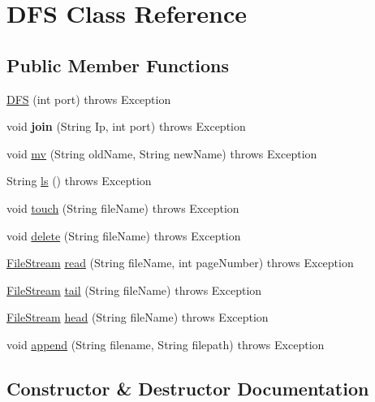 \hypertarget{class_d_f_s}{}\section{D\+FS Class Reference}
\label{class_d_f_s}
\subsection*{Public Member Functions}
\begin{DoxyCompactItemize}
\item 
\mbox{\hyperlink{class_d_f_s_ad863806217afcce82e64f5d7d4c124ad}{D\+FS}} (int port)  throws Exception     
\item 
\mbox{\label{class_d_f_s_afb27b3ac552ee5a0b615f76157ebde81}} 
void {\bfseries join} (String Ip, int port)  throws Exception 
\item 
void \mbox{\hyperlink{class_d_f_s_a7b0d44e11c6176a71d040919b6fe1d96}{mv}} (String old\+Name, String new\+Name)  throws Exception 
\item 
String \mbox{\hyperlink{class_d_f_s_a753e09aab8e500f333585f1a6ee865e1}{ls}} ()  throws Exception 
\item 
void \mbox{\hyperlink{class_d_f_s_ac44bf8288f4423fc87370b97f95f07c1}{touch}} (String file\+Name)  throws Exception 
\item 
void \mbox{\hyperlink{class_d_f_s_afa4df78a9af4f942cd878afc329b98e1}{delete}} (String file\+Name)  throws Exception 
\item 
\mbox{\hyperlink{class_file_stream}{File\+Stream}} \mbox{\hyperlink{class_d_f_s_a2fe4f98b6e0dede1c97d67bbb5c77df1}{read}} (String file\+Name, int page\+Number)  throws Exception     
\item 
\mbox{\hyperlink{class_file_stream}{File\+Stream}} \mbox{\hyperlink{class_d_f_s_a86ed64f3b14dc0c0d878dbcb1ca1cfa9}{tail}} (String file\+Name)  throws Exception     
\item 
\mbox{\hyperlink{class_file_stream}{File\+Stream}} \mbox{\hyperlink{class_d_f_s_a73915159a4290c3832635b6c4338ff7e}{head}} (String file\+Name)  throws Exception     
\item 
void \mbox{\hyperlink{class_d_f_s_a119519b72f38226815a4b65760701dcf}{append}} (String filename, String filepath)  throws Exception     
\end{DoxyCompactItemize}


\subsection{Constructor \& Destructor Documentation}
\mbox{\label{class_d_f_s_ad863806217afcce82e64f5d7d4c124ad}} 

